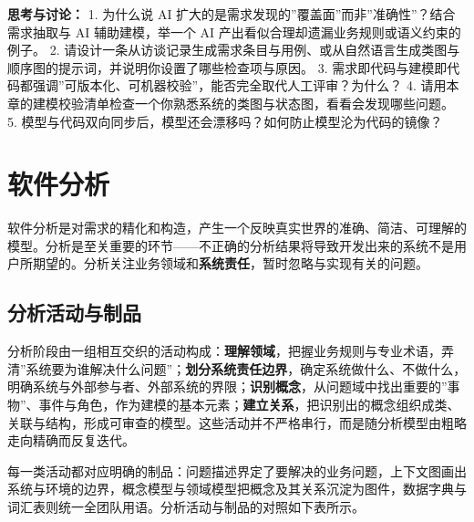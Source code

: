 \documentclass[12pt,a4paper,twoside,openany]{ctexbook}
\numberwithin{figure}{chapter}
\numberwithin{table}{chapter}
\begin{document}
\textbf{思考与讨论：} 1. 为什么说 AI
扩大的是需求发现的''覆盖面''而非''准确性''？结合需求抽取与 AI
辅助建模，举一个 AI 产出看似合理却遗漏业务规则或语义约束的例子。 2.
请设计一条从访谈记录生成需求条目与用例、或从自然语言生成类图与顺序图的提示词，并说明你设置了哪些检查项与原因。
3.
需求即代码与建模即代码都强调''可版本化、可机器校验''，能否完全取代人工评审？为什么？
4.
请用本章的建模校验清单检查一个你熟悉系统的类图与状态图，看看会发现哪些问题。
5. 模型与代码双向同步后，模型还会漂移吗？如何防止模型沦为代码的镜像？

\chapter{软件分析}\label{ux8f6fux4ef6ux5206ux6790}

软件分析是对需求的精化和构造，产生一个反映真实世界的准确、简洁、可理解的模型。分析是至关重要的环节------不正确的分析结果将导致开发出来的系统不是用户所期望的。分析关注业务领域和\textbf{系统责任}，暂时忽略与实现有关的问题。

\section{分析活动与制品}\label{ux5206ux6790ux6d3bux52a8ux4e0eux5236ux54c1}

分析阶段由一组相互交织的活动构成：\textbf{理解领域}，把握业务规则与专业术语，弄清''系统要为谁解决什么问题''；\textbf{划分系统责任边界}，确定系统做什么、不做什么，明确系统与外部参与者、外部系统的界限；\textbf{识别概念}，从问题域中找出重要的''事物''、事件与角色，作为建模的基本元素；\textbf{建立关系}，把识别出的概念组织成类、关联与结构，形成可审查的模型。这些活动并不严格串行，而是随分析模型由粗略走向精确而反复迭代。

每一类活动都对应明确的制品：问题描述界定了要解决的业务问题，上下文图画出系统与环境的边界，概念模型与领域模型把概念及其关系沉淀为图件，数据字典与词汇表则统一全团队用语。分析活动与制品的对照如下表所示。
\end{document}
